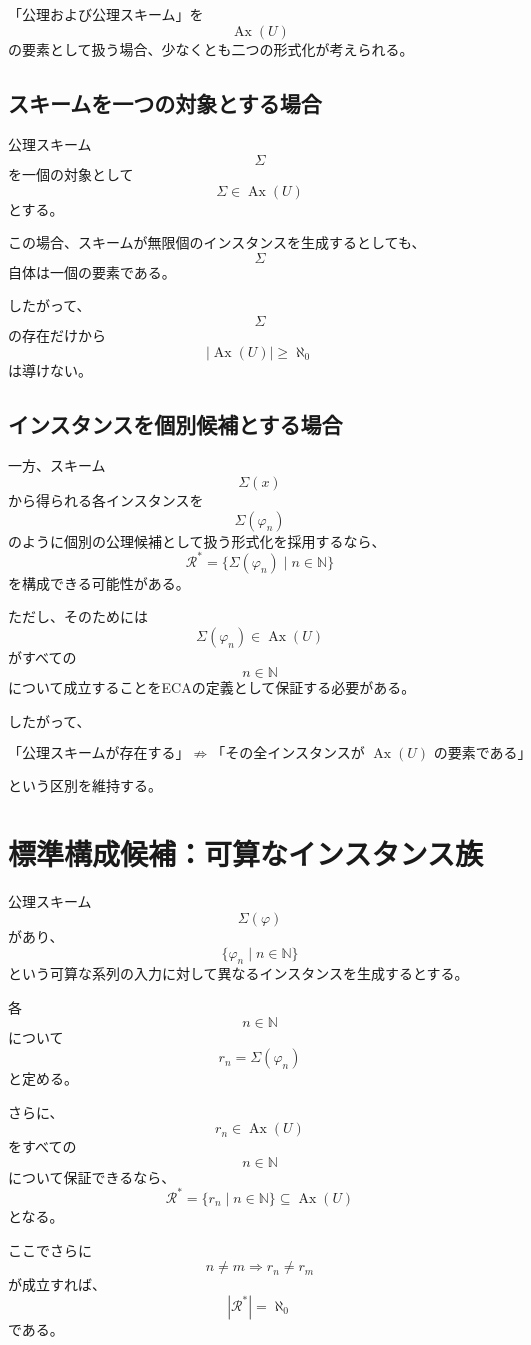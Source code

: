 \documentclass[a4paper,11pt]{ltjsarticle}
\begin{document}
「公理および公理スキーム」を
\[
\operatorname{Ax}(U)
\]
の要素として扱う場合、少なくとも二つの形式化が考えられる。

\subsection{スキームを一つの対象とする場合}

公理スキーム
\[
\Sigma
\]
を一個の対象として
\[
\Sigma\in\operatorname{Ax}(U)
\]
とする。

この場合、スキームが無限個のインスタンスを生成するとしても、
\[
\Sigma
\]
自体は一個の要素である。

したがって、
\[
\Sigma
\]
の存在だけから
\[
|\operatorname{Ax}(U)|\ge\aleph_0
\]
は導けない。

\subsection{インスタンスを個別候補とする場合}

一方、スキーム
\[
\Sigma(x)
\]
から得られる各インスタンスを
\[
\Sigma(\varphi_n)
\]
のように個別の公理候補として扱う形式化を採用するなら、
\[
\mathcal R^*
=
\{
\Sigma(\varphi_n)\mid n\in\mathbb N
\}
\]
を構成できる可能性がある。

ただし、そのためには
\[
\Sigma(\varphi_n)\in\operatorname{Ax}(U)
\]
がすべての
\[
n\in\mathbb N
\]
について成立することをECAの定義として保証する必要がある。

したがって、

\[
\boxed{
\text{「公理スキームが存在する」}
\not\Rightarrow
\text{「その全インスタンスが }\operatorname{Ax}(U)\text{ の要素である」}
}
\]

という区別を維持する。

\section{標準構成候補：可算なインスタンス族}

公理スキーム
\[
\Sigma(\varphi)
\]
があり、
\[
\{\varphi_n\mid n\in\mathbb N\}
\]
という可算な系列の入力に対して異なるインスタンスを生成するとする。

各
\[
n\in\mathbb N
\]
について
\[
r_n=\Sigma(\varphi_n)
\]
と定める。

さらに、
\[
r_n\in\operatorname{Ax}(U)
\]
をすべての
\[
n\in\mathbb N
\]
について保証できるなら、
\[
\mathcal R^*
=
\{r_n\mid n\in\mathbb N\}
\subseteq\operatorname{Ax}(U)
\]
となる。

ここでさらに
\[
n\neq m\Longrightarrow r_n\neq r_m
\]
が成立すれば、
\[
|\mathcal R^*|=\aleph_0
\]
である。
\end{document}
